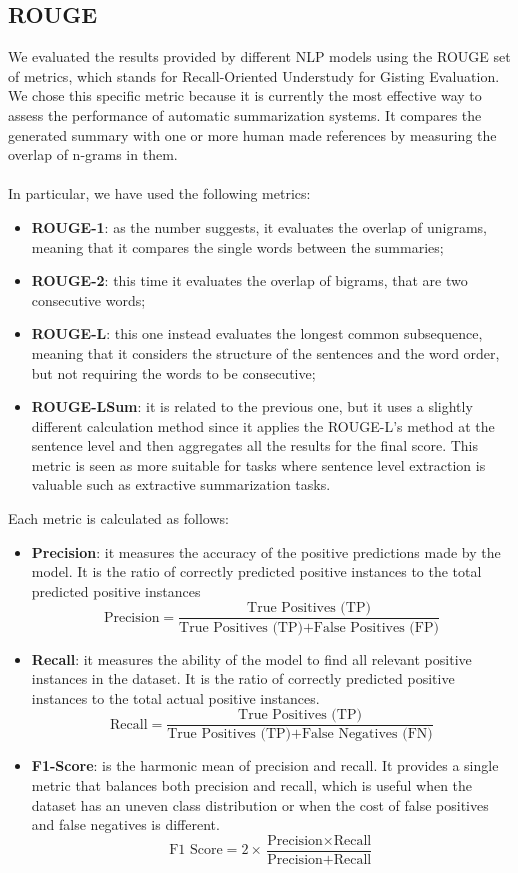 \documentclass[10pt,twocolumn,letterpaper]{article}
\begin{document}
\subsection{ROUGE}
We evaluated the results provided by different NLP models using the ROUGE set of metrics, which stands for Recall-Oriented Understudy for Gisting Evaluation. We chose this specific metric because it is currently the most effective way to assess the performance of automatic summarization systems. It compares the generated summary with one or more human made references by measuring the overlap of n-grams in them. \\ \\ 
In particular, we have used the following metrics:
\begin{itemize}
    \item \textbf{ROUGE-1}: as the number suggests, it evaluates the overlap of unigrams, meaning that it compares the single words between the summaries;
    \item \textbf{ROUGE-2}: this time it evaluates the overlap of bigrams, that are two consecutive words;
    \item \textbf{ROUGE-L}: this one instead evaluates the longest common subsequence, meaning that it considers the structure of the sentences and the word order, but not requiring the words to be consecutive;
    \item \textbf{ROUGE-LSum}: it is related to the previous one, but it uses a slightly different calculation method since it applies the ROUGE-L's method at the sentence level and then aggregates all the results for the final score. This metric is seen as more suitable for tasks where sentence level extraction is valuable such as extractive summarization tasks.
\end{itemize}
Each metric is calculated as follows:
\begin{itemize}
    \item \textbf{Precision}: it measures the accuracy of the positive predictions made by the model. It is the ratio of correctly predicted positive instances to the total predicted positive instances \\
    \[ \text{Precision} = \frac{\text{True Positives (TP)}}{\text{True Positives (TP)} + \text{False Positives (FP)}} \]
    \item \textbf{Recall}: it measures the ability of the model to find all relevant positive instances in the dataset. It is the ratio of correctly predicted positive instances to the total actual positive instances. \\
    \[ \text{Recall} = \frac{\text{True Positives (TP)}}{\text{True Positives (TP)} + \text{False Negatives (FN)}} \]
    \item \textbf{F1-Score}: is the harmonic mean of precision and recall. It provides a single metric that balances both precision and recall, which is useful when the dataset has an uneven class distribution or when the cost of false positives and false negatives is different. \\
    \[ \text{F1 Score} = 2 \times \frac{\text{Precision} \times \text{Recall}}{\text{Precision} + \text{Recall}} \]
\end{itemize}
\end{document}
